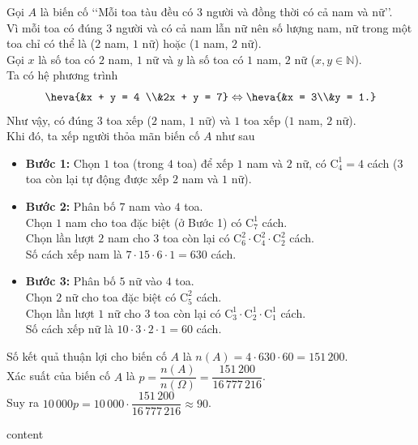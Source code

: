 \begin{ex}
{		Gọi $A$ là biến cố \lq\lq Mỗi toa tàu đều có $3$ người và đồng thời có cả nam và nữ\rq\rq.\\
		Vì mỗi toa có đúng $3$ người và có cả nam lẫn nữ nên số lượng nam, nữ trong một toa chỉ có thể là ($2$ nam, $1$ nữ) hoặc ($1$ nam, $2$ nữ).\\
		Gọi $x$ là số toa có $2$ nam, $1$ nữ và $y$ là số toa có $1$ nam, $2$ nữ ($x, y \in \mathbb{N}$). \\
		Ta có hệ phương trình
		\[\heva{&x + y = 4 \\&2x + y = 7} \Leftrightarrow \heva{&x = 3\\&y = 1.}\]
		Như vậy, có đúng $3$ toa xếp ($2$ nam, $1$ nữ) và $1$ toa xếp ($1$ nam, $2$ nữ).\\
		Khi đó, ta xếp người thỏa mãn biến cố $A$ như sau
		\begin{itemize}
			\item \textbf{Bước 1:} Chọn $1$ toa (trong $4$ toa) để xếp $1$ nam và $2$ nữ, có $\mathrm{C}_4^1 = 4$ cách ($3$ toa còn lại tự động được xếp $2$ nam và $1$ nữ).
			\item \textbf{Bước 2:} Phân bố $7$ nam vào $4$ toa. \\
			Chọn $1$ nam cho toa đặc biệt (ở Bước 1) có $\mathrm{C}_7^1$ cách.\\
			Chọn lần lượt $2$ nam cho $3$ toa còn lại có $\mathrm{C}_6^2 \cdot \mathrm{C}_4^2 \cdot \mathrm{C}_2^2$ cách. \\
			Số cách xếp nam là $7 \cdot 15 \cdot 6 \cdot 1 = 630$ cách.
			\item \textbf{Bước 3:} Phân bố $5$ nữ vào $4$ toa. \\
			Chọn $2$ nữ cho toa đặc biệt có $\mathrm{C}_5^2$ cách. \\
			Chọn lần lượt $1$ nữ cho $3$ toa còn lại có $\mathrm{C}_3^1 \cdot \mathrm{C}_2^1 \cdot \mathrm{C}_1^1$ cách. \\
			Số cách xếp nữ là $10 \cdot 3 \cdot 2 \cdot 1 = 60$ cách.
		\end{itemize}
		Số kết quả thuận lợi cho biến cố $A$ là $n(A) = 4 \cdot 630 \cdot 60 = 151\,200$.\\
		Xác suất của biến cố $A$ là $p = \dfrac{n(A)}{n(\Omega)} = \dfrac{151\,200}{16\,777\,216}$.\\
		Suy ra $10\,000p = 10\,000 \cdot \dfrac{151\,200}{16\,777\,216} \approx 90$.
	}
\end{ex}
\begin{ex}
	content
\end{ex}
